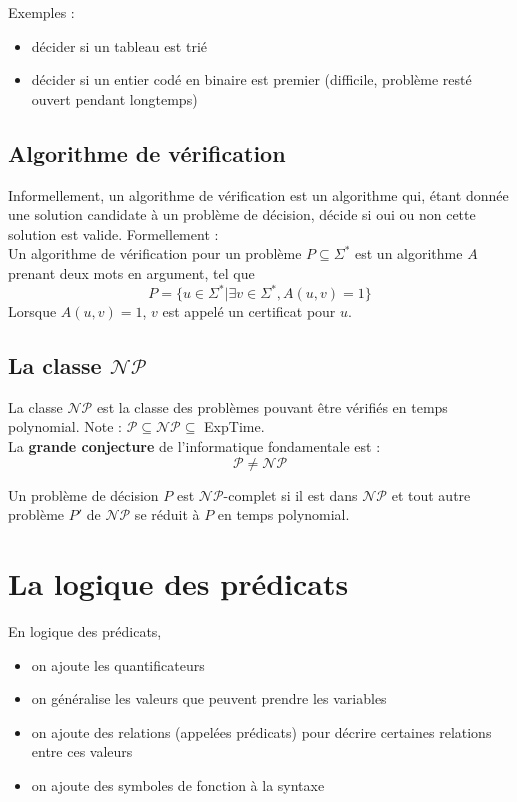 \documentclass[a4paper]{article}
\begin{document}
  Exemples :
  \begin{itemize}
    \item décider si un tableau est trié
    \item décider si un entier codé en binaire est premier (difficile, problème
    resté ouvert pendant longtemps)
  \end{itemize}

  \subsection{Algorithme de vérification}
  Informellement, un algorithme de vérification est un algorithme qui, étant donnée
  une solution candidate à un problème de décision, décide si oui ou non cette
  solution est valide. Formellement : \\

  Un algorithme de vérification pour un problème $P \subseteq \Sigma^*$ est un
  algorithme $A$ prenant deux mots en argument, tel que 
  $$ P = \{ u \in \Sigma^* | \exists v \in \Sigma^*, A(u,v) =1 \} $$
  Lorsque $A(u,v) = 1$, $v$ est appelé un certificat pour $u$.

  \subsection{La classe $\mathcal{N}\mathcal{P}$}
  La classe $\mathcal{N}\mathcal{P}$ est la classe des problèmes pouvant être vérifiés
  en temps polynomial. Note : $\mathcal{P} \subseteq \mathcal{N}\mathcal{P} \subseteq$ ExpTime.\\

  La \textbf{grande conjecture} de l'informatique fondamentale est :
  $$ \mathcal{P} \neq \mathcal{N}\mathcal{P} $$

  Un problème de décision $P$ est $\mathcal{N}\mathcal{P}$-complet si il est dans
  $\mathcal{N}\mathcal{P}$ et tout autre problème $P'$ de $\mathcal{N}\mathcal{P}$
  se réduit à $P$ en temps polynomial.


\section{La logique des prédicats}
  En logique des prédicats,
  \begin{itemize}
    \item on ajoute les quantificateurs
    \item on généralise les valeurs que peuvent prendre les variables
    \item on ajoute des relations (appelées prédicats) pour décrire certaines
    relations entre ces valeurs
    \item on ajoute des symboles de fonction à la syntaxe
  \end{itemize}
\end{document}
